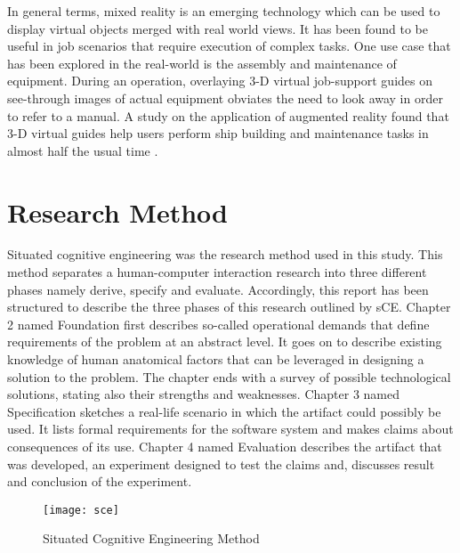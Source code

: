 In general terms, mixed reality is an emerging technology which can be used to display virtual objects merged with real world views. It has been found to be useful in job scenarios that require execution of complex tasks. One use case that has been explored in the real-world is the assembly and maintenance of equipment. During an operation, overlaying 3-D virtual job-support guides on see-through images of actual equipment obviates the need to look away in order to refer to a manual. A study on the application of augmented reality found that 3-D virtual guides help users perform ship building and maintenance tasks in almost half the usual time \parencite{henderson2011exploring}.



\section{Research Method}
Situated cognitive engineering \parencite{neerincx2008situated} was the research method used in this study. This method separates a human-computer interaction research into three different phases namely derive, specify and evaluate. Accordingly, this report has been structured to describe the three phases of this research outlined by sCE. Chapter 2 named Foundation first describes so-called operational demands that define requirements of the problem at an abstract level. It goes on to describe existing knowledge of human anatomical factors that can be leveraged in designing a solution to the problem. The chapter ends with a survey of possible technological solutions, stating also their strengths and weaknesses. Chapter 3 named Specification sketches a real-life scenario in which the artifact could possibly be used. It lists formal requirements for the software system and makes claims about consequences of its use. Chapter 4 named Evaluation describes the artifact that was developed, an experiment designed to test the claims and, discusses result and conclusion of the experiment. 

\begin{figure}
	\centering
	\texttt{[image: sce]}
	\caption{Situated Cognitive Engineering Method \parencite{neerincx2008situated}}
	\label{fig:augreal}
\end{figure}
